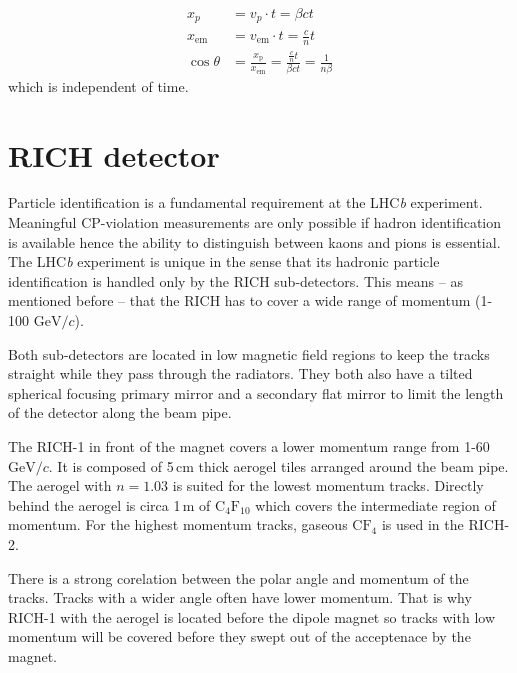 \documentclass[11pt,twoside]{scrreprt}
\begin{document}
\begin{align}
    x_p &= v_{p}\cdot t = \beta c t \nonumber \\
    x_{\text{em}} &= v_{\text{em}}\cdot t=\frac{c}{n}t \nonumber \\
    \cos\theta &= \frac{x_{\text{p}}}{x_{\text{em}}} = \frac{\frac{c}{n}t}{\beta c t} = \frac{1}{n\beta} \nonumber
\end{align}
which is independent of time.

\section{RICH detector} %
\label{sec:rich_detector}

Particle identification is a fundamental requirement at the LHC\textit{b} experiment. Meaningful CP-violation measurements are only possible if hadron identification is available hence the ability to distinguish between kaons and pions is  essential.
The LHC\textit{b} experiment is unique in the sense that its hadronic particle identification is handled only by the RICH sub-detectors. This means -- as mentioned before -- that the RICH has to cover a wide range of momentum (1-100 $\text{GeV}/c$).

Both sub-detectors are located in low magnetic field regions to keep the tracks straight while they pass through the radiators. They both 
also have a tilted spherical focusing primary mirror and a secondary flat mirror to limit the length of the detector along the beam pipe.

The RICH-1 in front of the magnet covers a lower momentum range from 1-60 $\text{GeV}/c$. It is composed of 5\,cm thick aerogel tiles arranged around the beam pipe. The aerogel with $n=1.03$ is suited for the lowest momentum tracks. Directly behind the aerogel is circa 1\,m of $\text{C}_4\text{F}_{10}$ which covers the intermediate region of momentum.
For the highest momentum tracks, gaseous $\text{C}\text{F}_4$ is used in the RICH-2.

There is a strong corelation between the polar angle and momentum of the tracks. Tracks with a wider angle often have lower momentum. That is why RICH-1 with the aerogel is located before the dipole magnet so tracks with low momentum will be covered before they swept out of the acceptenace by the magnet.
\end{document}
